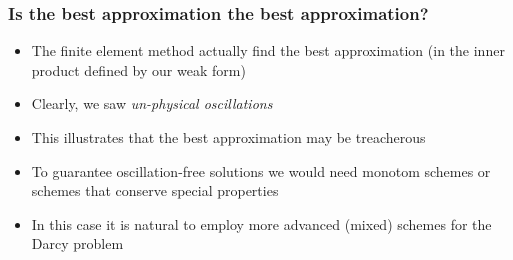 \begin{frame}
\frametitle{Is the best approximation the best approximation?}
\begin{itemize}
\item The finite element method actually find the best approximation (in the inner
product defined by our weak form)
\item Clearly, we saw \emph{un-physical oscillations} 
\item This illustrates that the best approximation may be treacherous 
\item To guarantee oscillation-free solutions we would need monotom schemes 
or schemes that conserve special properties 
\item In this case it is natural to employ more advanced (mixed) schemes
for the Darcy problem
\end{itemize}
\end{frame}
